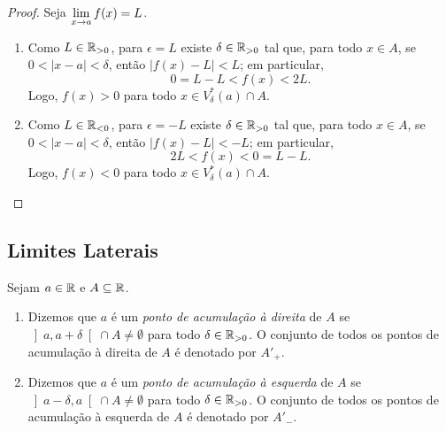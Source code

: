 \begin{proof}
    Seja $\displaystyle \lim_{x \to a} f(x) = L$.
        \begin{enumerate}[leftmargin=*, align=left, label=\textbf{(\alph*)}]
            \item Como $L \in \mathbb{R}_{>0}$, para $\epsilon = L$ existe $\delta \in \mathbb{R}_{>0}$ tal que, para todo $x \in A$, se $0<|x-a|<\delta$, então $|f(x) - L| < L$; em particular,
                \[
                    0 = L - L < f(x) < 2L.
                \]
            Logo, $f(x) > 0$ para todo $x \in V^*_{\delta}(a) \cap A$. \blackproof
            \item Como $L \in \mathbb{R}_{<0}$, para $\epsilon = -L$ existe $\delta \in \mathbb{R}_{>0}$ tal que, para todo $x \in A$, se $0<|x-a|<\delta$, então $|f(x) - L| < -L$; em particular,
                \[
                    2L < f(x) < 0 = L - L.
                \]
            Logo, $f(x) < 0$ para todo $x \in V^*_{\delta}(a) \cap A$. \blackproof
        \end{enumerate}
\end{proof}

\subsection{Limites Laterais}

\begin{definition}
    Sejam $a \in \mathbb{R}$ e $A \subseteq \mathbb{R}$.
        \begin{enumerate}[leftmargin=*, align=left, label=\textbf{(\alph*)}]
            \item Dizemos que $a$ é um \emph{ponto de acumulação à direita} de $A$ se 
                $
                    \left]a, a+ \delta \right[ \cap A \neq \emptyset
                $
            para todo $\delta \in \mathbb{R}_{>0}$. O conjunto de todos os pontos de acumulação à direita de $A$ é denotado por $A'_+$.
            \item Dizemos que $a$ é um \emph{ponto de acumulação à esquerda} de $A$ se
                $
                    \left]a - \delta, a\right[ \cap A \neq \emptyset
                $
            para todo $\delta \in \mathbb{R}_{>0}$. O conjunto de todos os pontos de acumulação à esquerda de $A$ é denotado por $A'_-$.
        \end{enumerate}
\end{definition}

